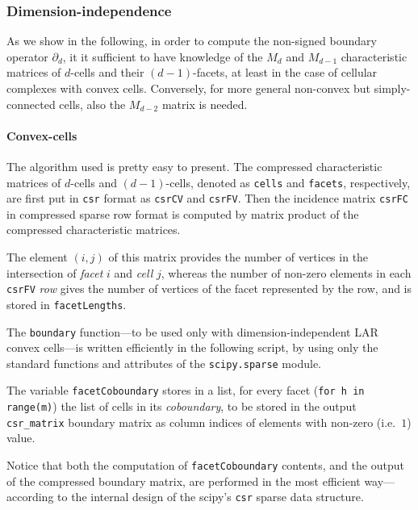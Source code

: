 \documentclass[11pt,oneside]{article}	%
\begin{document}
\subsubsection{Dimension-independence}

As we show in the following, in order to compute the non-signed boundary operator $\partial_d$, it it sufficient to have knowledge of the $M_d$ and $M_{d-1}$ characteristic matrices of $d$-cells and their $(d-1)$-facets, at least in the case of cellular complexes with convex cells. Conversely, for more general non-convex but simply-connected cells, also the $M_{d-2}$ matrix is needed.

\paragraph{Convex-cells}

The algorithm used is pretty easy to present. The compressed characteristic matrices of $d$-cells and $(d-1)$-cells, denoted as \texttt{cells} and \texttt{facets}, respectively, are first put in \texttt{csr} format as \texttt{csrCV} and \texttt{csrFV}. Then the incidence matrix \texttt{csrFC} in compressed sparse row format is computed by matrix product of the compressed characteristic matrices. 

The element $(i,j)$ of this matrix provides the number of vertices in the intersection of \emph{facet} $i$ and \emph{cell} $j$, whereas the number of non-zero elements in each \texttt{csrFV} \emph{row} gives the number of vertices of the facet represented by the row, and is stored in \texttt{facetLengths}. 

The \texttt{boundary} function---to be used only with dimension-independent LAR convex cells---is written efficiently in the following script, by using only the standard functions and attributes of the \texttt{scipy.sparse} module.

The variable \texttt{facetCoboundary} stores in a list, for every facet (\texttt{for h in range(m)})
the list of cells in its \emph{coboundary}, to be stored in the output \texttt{csr\_matrix} boundary matrix as column indices of elements with non-zero (i.e.~$1$) value.

Notice that both the computation of \texttt{facetCoboundary} contents, and the output of the compressed boundary matrix, are performed in the most efficient way---according to the internal design of the scipy's \texttt{csr} sparse data structure.
\end{document}
